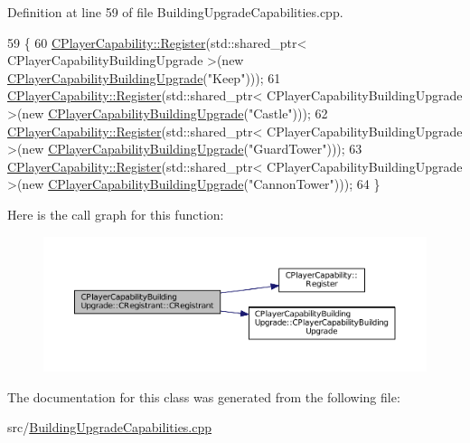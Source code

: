 Definition at line 59 of file Building\+Upgrade\+Capabilities.\+cpp.


\begin{DoxyCode}
59                                                         \{
60     \hyperlink{classCPlayerCapability_a7e298018dcde2684451add3cfff065f7}{CPlayerCapability::Register}(std::shared\_ptr<
       CPlayerCapabilityBuildingUpgrade >(\textcolor{keyword}{new} \hyperlink{classCPlayerCapabilityBuildingUpgrade_a80ccec4b17a9e43914bec537dcbe1b9e}{CPlayerCapabilityBuildingUpgrade}(\textcolor{stringliteral}{"Keep"})));   
61     \hyperlink{classCPlayerCapability_a7e298018dcde2684451add3cfff065f7}{CPlayerCapability::Register}(std::shared\_ptr<
       CPlayerCapabilityBuildingUpgrade >(\textcolor{keyword}{new} \hyperlink{classCPlayerCapabilityBuildingUpgrade_a80ccec4b17a9e43914bec537dcbe1b9e}{CPlayerCapabilityBuildingUpgrade}(\textcolor{stringliteral}{"Castle"})));
62     \hyperlink{classCPlayerCapability_a7e298018dcde2684451add3cfff065f7}{CPlayerCapability::Register}(std::shared\_ptr<
       CPlayerCapabilityBuildingUpgrade >(\textcolor{keyword}{new} \hyperlink{classCPlayerCapabilityBuildingUpgrade_a80ccec4b17a9e43914bec537dcbe1b9e}{CPlayerCapabilityBuildingUpgrade}(\textcolor{stringliteral}{"GuardTower"})));   
63     \hyperlink{classCPlayerCapability_a7e298018dcde2684451add3cfff065f7}{CPlayerCapability::Register}(std::shared\_ptr<
       CPlayerCapabilityBuildingUpgrade >(\textcolor{keyword}{new} \hyperlink{classCPlayerCapabilityBuildingUpgrade_a80ccec4b17a9e43914bec537dcbe1b9e}{CPlayerCapabilityBuildingUpgrade}(\textcolor{stringliteral}{"CannonTower"})));
64 \}
\end{DoxyCode}
Here is the call graph for this function\+:
\nopagebreak
\begin{figure}[H]
\begin{center}
\leavevmode
\includegraphics[width=350pt]{classCPlayerCapabilityBuildingUpgrade_1_1CRegistrant_a85e216de0285430da642fa71f2a79a34_cgraph}
\end{center}
\end{figure}


The documentation for this class was generated from the following file\+:\begin{DoxyCompactItemize}
\item 
src/\hyperlink{BuildingUpgradeCapabilities_8cpp}{Building\+Upgrade\+Capabilities.\+cpp}\end{DoxyCompactItemize}
